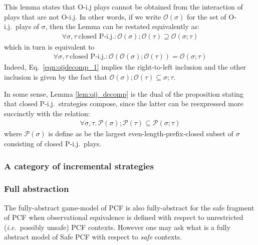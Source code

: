  This lemma states that O-i.j plays cannot be obtained from
the interaction of plays that are not O-i.j. In other words, if we
write $\mathcal{O}(\sigma)$ for the set of O-i.j.\ plays of
$\sigma$, then the Lemma can be restated equivalently as:
\begin{eqnarray}
     \forall \sigma, \tau\ \mbox{closed P-i.j.}: \mathcal{O}(\sigma) ; \mathcal{O}(\tau) \supseteq \mathcal{O}(\sigma ; \tau)
     \label{eqn:oijdecomp_1}
\end{eqnarray}
which in turn is equivalent to
\begin{eqnarray}
    \forall \sigma, \tau\ \mbox{closed P-i.j.}: \mathcal{O}( \mathcal{O}(\sigma) ; \mathcal{O}(\tau) ) = \mathcal{O}(\sigma ; \tau)
    \label{eqn:oijdecomp_2}
\end{eqnarray}
Indeed, Eq.~\ref{eqn:oijdecomp_1} implies the right-to-left inclusion and the other inclusion
is given by the fact that $\mathcal{O}(\sigma) ; \mathcal{O}(\tau) \subseteq \sigma;\tau$.


In some sense, Lemma \ref{lem:oij_decomp} is the dual of the proposition stating that closed P-i.j.\
strategies compose, since  the latter can be reexpressed more succinctly with the relation:
\begin{eqnarray}
     \forall \sigma, \tau .\, \mathcal{P}(\sigma) ; \mathcal{P}(\tau) \subseteq \mathcal{P}(\sigma ; \tau)
     \label{eqn:pijcomp_1}
\end{eqnarray}
where $\mathcal{P}(\sigma)$ is define as be the largest even-length-prefix-closed subset of $\sigma$ consisting of closed P-i.j.\ plays.

\subsubsection{A category of incremental strategies}


\subsubsection{Full abstraction}

The fully-abstract game-model of PCF is also fully-abstract for the
safe fragment of PCF when observational equivalence is defined with
respect to unrestricted ({\it i.e.}~possibly unsafe) PCF contexts.
However one may ask what is a fully abstract model of Safe PCF with
respect to \emph{safe} contexts.





